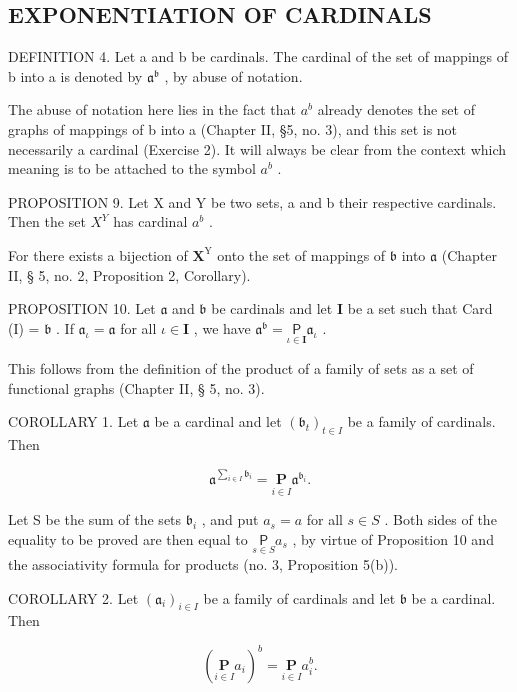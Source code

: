 \subsection{EXPONENTIATION OF CARDINALS}

DEFINITION 4. Let a and b be cardinals. The cardinal of the set of mappings of b into a is denoted by \(\mathfrak{a}^{\mathfrak{b}}\) , by abuse of notation.

The abuse of notation here lies in the fact that \(a^{b}\) already denotes the set of graphs of mappings of b into a (Chapter II, §5, no. 3), and this set is not necessarily a cardinal (Exercise 2). It will always be clear from the context which meaning is to be attached to the symbol \(a^{b}\) .

PROPOSITION 9. Let X and Y be two sets, a and b their respective cardinals. Then the set \(X^{Y}\) has cardinal \(a^{b}\) .

For there exists a bijection of \(\mathbf{X}^{\mathrm{Y}}\) onto the set of mappings of \(\mathfrak{b}\) into \(\mathfrak{a}\) (Chapter II, § 5, no. 2, Proposition 2, Corollary).

PROPOSITION 10. Let \(\mathfrak{a}\) and \(\mathfrak{b}\) be cardinals and let \(\mathbf{I}\) be a set such that Card (I) = \(\mathfrak{b}\) . If \(\mathfrak{a}_{\iota} = \mathfrak{a}\) for all \(\iota \in \mathbf{I}\) , we have \(\mathfrak{a}^{\mathfrak{b}} = \underset{\iota \in \mathbf{I}}{\mathsf{P}}\mathfrak{a}_{\iota}\) .

This follows from the definition of the product of a family of sets as a set of functional graphs (Chapter II, § 5, no. 3).

COROLLARY 1. Let \(\mathfrak{a}\) be a cardinal and let \((\mathfrak{b}_t)_{t\in I}\) be a family of cardinals. Then

\[
\mathfrak{a}^{\sum_{i \in I} \mathfrak{b}_i} = \underset {i \in I} {\mathbf {P}} \mathfrak{a}^{\mathfrak{b}_i}.
\]

Let S be the sum of the sets \(\mathfrak{b}_i\) , and put \(a_s = a\) for all \(s \in S\) . Both sides of the equality to be proved are then equal to \(\underset{s \in S}{\mathsf{P}} a_s\) , by virtue of Proposition 10 and the associativity formula for products (no. 3, Proposition 5(b)).

COROLLARY 2. Let \((\mathfrak{a}_i)_{i\in I}\) be a family of cardinals and let \(\mathfrak{b}\) be a cardinal. Then

\[
\left(\underset {i \in I} {\mathbf {P}} a _ {i}\right) ^ {b} = \underset {i \in I} {\mathbf {P}} a _ {i} ^ {b}.
\]

